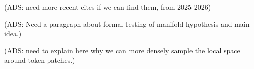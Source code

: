 
\newcommand{\xl}[1]{{\color{blue} (XL: #1)}}
\newcommand{\ads}[1]{{\color{magenta} (ADS: #1)}}


\ads{need more recent cites if we can find them, from 2025-2026}

\ads{Need a paragraph about formal testing of manifold hypothesis and main idea.}

\ads{need to explain here why we can more densely sample the local space around token patches.}
